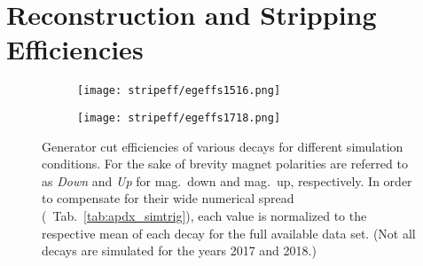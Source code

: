 \chapter{Reconstruction and Stripping Efficiencies}
\label{chap:apdx_stripeff}

\begin{figure}[htbp]
    \centering
    \begin{subfigure}{\textwidth}
        \centering
        \texttt{[image: stripeff/egeffs1516.png]}
    \end{subfigure}
    \par\bigskip 
    \begin{subfigure}{\textwidth}
        \centering
        \texttt{[image: stripeff/egeffs1718.png]}
    \end{subfigure}
    \caption{Generator cut efficiencies of various decays for different simulation conditions. For the sake of brevity magnet polarities are referred to as \textit{Down} and \textit{Up} for mag.\ down and mag.\ up, respectively. In order to compensate for their wide numerical spread (\cf{}~Tab.~\ref{tab:apdx_simtrig}), each value is normalized to the respective mean of each decay for the full available data set. (Not all decays are simulated for the years 2017 and 2018.)}
    \label{fig:apdx_gencuteff}
\end{figure}

